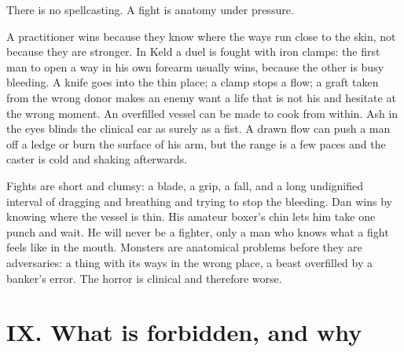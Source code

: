 \documentclass{design/chronicle}
\begin{document}
There is no spellcasting. A fight is anatomy under pressure.

A practitioner wins because they know where the ways run close to the skin, not because they are stronger. In Keld a duel is fought with iron clamps: the first man to open a way in his own forearm usually wins, because the other is busy bleeding. A knife goes into the thin place; a clamp stops a flow; a graft taken from the wrong donor makes an enemy want a life that is not his and hesitate at the wrong moment. An overfilled vessel can be made to cook from within. Ash in the eyes blinds the clinical ear as surely as a fist. A drawn flow can push a man off a ledge or burn the surface of his arm, but the range is a few paces and the caster is cold and shaking afterwards.

Fights are short and clumsy: a blade, a grip, a fall, and a long undignified interval of dragging and breathing and trying to stop the bleeding. Dan wins by knowing where the vessel is thin. His amateur boxer’s chin lets him take one punch and wait. He will never be a fighter, only a man who knows what a fight feels like in the mouth. Monsters are anatomical problems before they are adversaries: a thing with its ways in the wrong place, a beast overfilled by a banker’s error. The horror is clinical and therefore worse.

\section*{IX. What is forbidden, and why}
\end{document}
